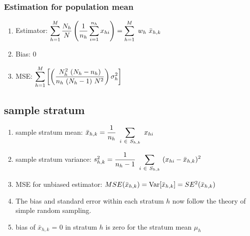 \subsubsection{Estimation for population mean}
\begin{enumerate}
    \item Estimator: $
        \displaystyle\sum_{h=1}^{M}
        \dfrac{N_h}{N}
        \left(\dfrac{1}{n_h} \displaystyle\sum_{i=1}^{n_h} x_{hi}\right)
        =
        \displaystyle\sum_{h=1}^{M} \ w_h \ \bar{x}_{h,k}
    $
    \hfill \cite{statistics/book/Statistics-for-Data-Scientists/Maurits-Kaptein}

    \item Bias: $0$
    \hfill \cite{statistics/book/Statistics-for-Data-Scientists/Maurits-Kaptein}

    \item MSE: $
        \displaystyle\sum_{h=1}^{M}
        \left[
            \left(
                \dfrac{
                    N_h^2\ (N_h - n_h)
                }{
                    n_h\ (N_h-1)\ N^2
                }
            \right) \sigma_h^2
        \right]
    $
    \hfill \cite{statistics/book/Statistics-for-Data-Scientists/Maurits-Kaptein}
\end{enumerate}




\subsection{sample stratum}
\begin{enumerate}
    \item sample stratum mean: $
        \bar{x}_{h,k} = \dfrac{1}{n_h} \ \displaystyle\sum_{i \ \in \ S_{h,k}} \ x_{hi}
    $
    \hfill \cite{statistics/book/Statistics-for-Data-Scientists/Maurits-Kaptein}

    \item sample stratum variance: $
        s^2_{h,k} = \dfrac{1}{n_h-1} \ \displaystyle\sum_{i \ \in \ S_{h,k}} \ (x_{hi} - \bar{x}_{h,k})^2
    $
    \hfill \cite{statistics/book/Statistics-for-Data-Scientists/Maurits-Kaptein}

    \item MSE for unbiased estimator:
    $
        MSE(\bar{x}_{h,k}) = \text{Var}[\bar{x}_{h,k}] = SE^2(\bar{x}_{h,k})
    $
    \hfill \cite{common/online/chatgpt}

    \item The bias and standard error within each stratum $h$ now follow the theory of simple random sampling.
    \hfill \cite{statistics/book/Statistics-for-Data-Scientists/Maurits-Kaptein}

    \item bias of $\bar{x}_{h,k}$ = 0 in stratum $h$ is zero for the stratum mean $\mu_h$

\end{enumerate}


